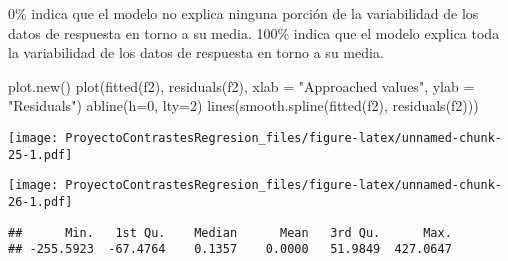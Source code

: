 \documentclass[
]{article}
\newenvironment{Shaded}{\begin{snugshade}}{\end{snugshade}}
\newcommand{\AttributeTok}[1]{\textcolor[rgb]{0.77,0.63,0.00}{#1}}
\newcommand{\DecValTok}[1]{\textcolor[rgb]{0.00,0.00,0.81}{#1}}
\newcommand{\FunctionTok}[1]{\textcolor[rgb]{0.00,0.00,0.00}{#1}}
\newcommand{\NormalTok}[1]{#1}
\newcommand{\SpecialCharTok}[1]{\textcolor[rgb]{0.00,0.00,0.00}{#1}}
\newcommand{\StringTok}[1]{\textcolor[rgb]{0.31,0.60,0.02}{#1}}
\begin{document}
0\% indica que el modelo no explica ninguna porción de la variabilidad
de los datos de respuesta en torno a su media. 100\% indica que el
modelo explica toda la variabilidad de los datos de respuesta en torno a
su media.

\begin{Shaded}
\begin{Highlighting}[]
\FunctionTok{plot.new}\NormalTok{()}
\FunctionTok{plot}\NormalTok{(}\FunctionTok{fitted}\NormalTok{(f2), }\FunctionTok{residuals}\NormalTok{(f2), }\AttributeTok{xlab =} \StringTok{"Approached values"}\NormalTok{,  }\AttributeTok{ylab =} \StringTok{"Residuals"}\NormalTok{)}
  \FunctionTok{abline}\NormalTok{(}\AttributeTok{h=}\DecValTok{0}\NormalTok{, }\AttributeTok{lty=}\DecValTok{2}\NormalTok{)}
    \FunctionTok{lines}\NormalTok{(}\FunctionTok{smooth.spline}\NormalTok{(}\FunctionTok{fitted}\NormalTok{(f2), }\FunctionTok{residuals}\NormalTok{(f2)))}
\end{Highlighting}
\end{Shaded}

\texttt{[image: ProyectoContrastesRegresion\_files/figure-latex/unnamed-chunk-25-1.pdf]}

\begin{Shaded}
\end{Shaded}

\texttt{[image: ProyectoContrastesRegresion\_files/figure-latex/unnamed-chunk-26-1.pdf]}

\begin{Shaded}
\end{Shaded}

\begin{verbatim}
##      Min.   1st Qu.    Median      Mean   3rd Qu.      Max. 
## -255.5923  -67.4764    0.1357    0.0000   51.9849  427.0647
\end{verbatim}

\begin{Shaded}
\end{Shaded}
\end{document}
